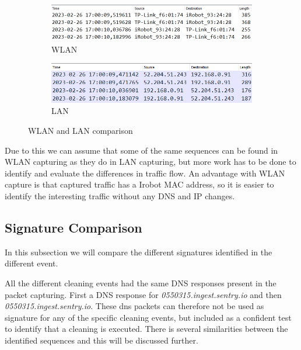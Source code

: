 \begin{figure}[H]
    \centering
    \begin{subfigure}[b]{0.9\textwidth}
        \includegraphics[width=\textwidth]{figures/WLANLANComparison.png}
        \caption{WLAN}
    \end{subfigure}
    \quad
    \begin{subfigure}[b]{0.9\textwidth}
        \includegraphics[width=\textwidth]{figures/LANWLANcomparison.png}
        \caption{LAN}
    \end{subfigure}
    
    \caption{WLAN and LAN comparison}
    \label{fig:WLANLANHeader}
\end{figure}


Due to this we can assume that some of the same sequences can be found in WLAN capturing as they do in LAN capturing, but more work has to be done to identify and evaluate the differences in traffic flow. An advantage with WLAN capture is that captured traffic has a Irobot MAC address, so it is easier to identify the interesting traffic without any DNS and IP changes. 




\subsection{Signature Comparison}
In this subsection we will compare the different signatures identified in the different event. 

All the different cleaning events had the same DNS responses present in the packet capturing. First a DNS response for \textit{0550315.ingest.sentry.io} and then \textit{0550315.ingest.sentry.io}. These dns packets can therefore not be used as signature for any of the specific cleaning events, but included as a confident test to identify that a cleaning is executed. There is several similarities between the identified sequences and this will be discussed further.


